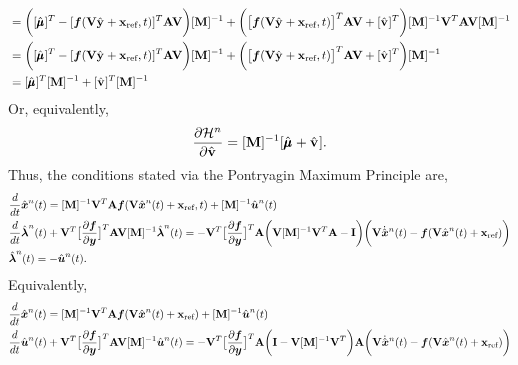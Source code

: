 \documentclass[3p,computermodern,10pt]{elsarticle}
\begin{document}
\begin{appendices}
\begin{align*}
& = \bigg( [\adjointDiscreteDumArgnt{}]^T - [\velocity(\veloargsromy) ]^T \stweightingMatArg{n} \basisspace \bigg) [\massArgnt{n}]^{-1}  + \bigg(  \big[ \velocity(\veloargsromy) \big]^T \stweightingMatArg{n} \basisspace + [\controllerDiscreteDumArgnt{}]^T   \bigg) [\massArgnt{n}]^{-1}\basisspace^T  \stweightingMatArg{n} \basisspace [\massArgnt{n}]^{-1}  \\
& = \bigg( [\adjointDiscreteDumArgnt{}]^T - [\velocity(\veloargsromy) ]^T \stweightingMatArg{n} \basisspace \bigg) [\massArgnt{n}]^{-1}  + \bigg(  \big[ \velocity(\veloargsromy) \big]^T \stweightingMatArg{n} \basisspace + [\controllerDiscreteDumArgnt{}]^T   \bigg) [\massArgnt{n}]^{-1}  \\
& =  [\adjointDiscreteDumArgnt{}]^T  [\massArgnt{n}]^{-1}  +  [\controllerDiscreteDumArgnt{}]^T   [\massArgnt{n}]^{-1}  
\end{align*}
Or, equivalently,
\begin{equation*}
\frac{\partial \hamiltonianArg{n}}{\partial \controllerDiscreteDumArgnt{}} = 
  [\massArgnt{n}]^{-1} [\adjointDiscreteDumArgnt{} +  \controllerDiscreteDumArgnt{}]. 
\end{equation*}
Thus, the conditions stated via the Pontryagin Maximum Principle are,
\begin{align*}%
&\frac{d}{dt}\genstateArg{n}{t} =  [\massArgnt{n}]^{-1}\basisspace^T \stweightingMatArg{n}\velocity(\veloargsromn) + [\massArgnt{n}]^{-1}\controllerArg{n}{t}\\ 
&\frac{d }{dt} \adjointArg{n}{t}  + \basisspace^T \big[  \frac{\partial \velocity}{\partial \statey} \big]^T \stweightingMatArg{n}  \basisspace [\massArgnt{n}]^{-1}  \adjointArg{n}{t} = 
 - \basisspace^T \big[  \frac{\partial \velocity}{\partial \statey} \big]^T \stweightingMatArg{n} 
\bigg(  \basisspace  [\massArgnt{n}]^{-1}\basisspace^T \stweightingMatArg{n} - \mathbf{I} \bigg)
 \bigg( \basisspace \genstateDotArg{n}{t} - \velocity(\basisspace \genstateArg{n}{t} + \stateIntercept) \bigg) \\ 
& \adjointArg{n}{t}= -\controllerArg{n}{t}.
\end{align*}
Equivalently,
\begin{align*}%
&\frac{d}{dt}\genstateArg{n}{t} =  [\massArgnt{n}]^{-1}\basisspace^T \stweightingMatArg{n}\velocity(\basisspace \genstateArg{n}{t} + \stateIntercept) + [\massArgnt{n}]^{-1}\controllerArg{n}{t} \\ 
&\frac{d}{dt} \controllerArg{n}{t}  + \basisspace^T \big[  \frac{\partial \velocity}{\partial \statey} \big]^T \stweightingMatArg{n}  \basisspace [\massArgnt{n}]^{-1}  \controllerArg{n}{t} = 
 - \basisspace^T \big[  \frac{\partial \velocity}{\partial \statey} \big]^T \stweightingMatArg{n} 
\bigg( \mathbf{I} -   \basisspace  [\massArgnt{n}]^{-1}\basisspace^T \bigg)
\stweightingMatArg{n} \bigg( \basisspace \genstateDotArg{n}{t} - \velocity(\basisspace \genstateArg{n}{t} + \stateIntercept) \bigg) 
\end{align*}



\end{appendices}
\end{document}
